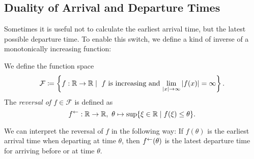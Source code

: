 \subsection{Duality of Arrival and Departure Times}

Sometimes it is useful not to calculate the earliest arrival time, but the latest possible departure time.
To enable this switch, we define a kind of inverse of a monotonically increasing function:



\newcommand{\IncCoercive}{\mathcal{F}}
\begin{definition}
    We define the function space 
    \[
        \IncCoercive \coloneqq \left\{ f:\R \rightarrow \R \mid \text{ $f$ is increasing and $ \lim_{\abs{x}\rightarrow\infty} \abs{f(x)} = \infty$} \right\}.
    \]
    The \emph{reversal of $f\in\IncCoercive$} is defined as 
    \[
        \minv{f}:\R \rightarrow \R,\ \theta\mapsto \sup \{ \xi\in\R \mid f(\xi) \leq \theta \}.
    \]
\end{definition}

We can interpret the reversal of $f$ in the following way:
If $f(\theta)$ is the earliest arrival time when departing at time $\theta$, then $f^{\leftarrow}(\theta)$ is the latest departure time for arriving before or at time $\theta$.

